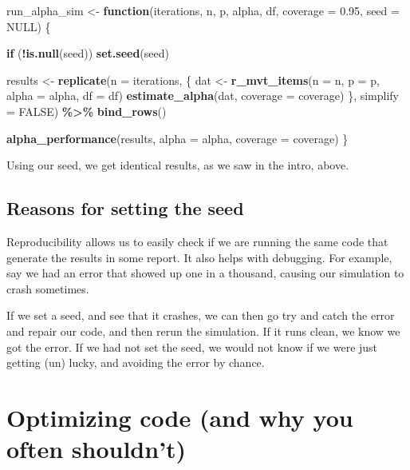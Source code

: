 \documentclass[
]{book}
\newenvironment{Shaded}{\begin{snugshade}}{\end{snugshade}}
\newcommand{\AttributeTok}[1]{\textcolor[rgb]{0.13,0.29,0.53}{#1}}
\newcommand{\ConstantTok}[1]{\textcolor[rgb]{0.56,0.35,0.01}{#1}}
\newcommand{\ControlFlowTok}[1]{\textcolor[rgb]{0.13,0.29,0.53}{\textbf{#1}}}
\newcommand{\FloatTok}[1]{\textcolor[rgb]{0.00,0.00,0.81}{#1}}
\newcommand{\FunctionTok}[1]{\textcolor[rgb]{0.13,0.29,0.53}{\textbf{#1}}}
\newcommand{\NormalTok}[1]{#1}
\newcommand{\OtherTok}[1]{\textcolor[rgb]{0.56,0.35,0.01}{#1}}
\newcommand{\SpecialCharTok}[1]{\textcolor[rgb]{0.81,0.36,0.00}{\textbf{#1}}}
\begin{document}
\begin{Shaded}
\begin{Highlighting}[]
\NormalTok{run\_alpha\_sim }\OtherTok{\textless{}{-}} \ControlFlowTok{function}\NormalTok{(iterations, n, p, alpha, df, }\AttributeTok{coverage =} \FloatTok{0.95}\NormalTok{, }\AttributeTok{seed =} \ConstantTok{NULL}\NormalTok{) \{}
  
  \ControlFlowTok{if}\NormalTok{ (}\SpecialCharTok{!}\FunctionTok{is.null}\NormalTok{(seed)) }\FunctionTok{set.seed}\NormalTok{(seed)}

\NormalTok{  results }\OtherTok{\textless{}{-}} 
    \FunctionTok{replicate}\NormalTok{(}\AttributeTok{n =}\NormalTok{ iterations, \{}
\NormalTok{      dat }\OtherTok{\textless{}{-}} \FunctionTok{r\_mvt\_items}\NormalTok{(}\AttributeTok{n =}\NormalTok{ n, }\AttributeTok{p =}\NormalTok{ p, }\AttributeTok{alpha =}\NormalTok{ alpha, }\AttributeTok{df =}\NormalTok{ df)}
      \FunctionTok{estimate\_alpha}\NormalTok{(dat, }\AttributeTok{coverage =}\NormalTok{ coverage)}
\NormalTok{    \}, }\AttributeTok{simplify =} \ConstantTok{FALSE}\NormalTok{) }\SpecialCharTok{\%\textgreater{}\%}
    \FunctionTok{bind\_rows}\NormalTok{()}
  
  \FunctionTok{alpha\_performance}\NormalTok{(results, }\AttributeTok{alpha =}\NormalTok{ alpha, }\AttributeTok{coverage =}\NormalTok{ coverage)}
\NormalTok{\}}
\end{Highlighting}
\end{Shaded}

Using our seed, we get identical results, as we saw in the intro, above.

\section{Reasons for setting the seed}\label{reasons-for-setting-the-seed}

Reproducibility allows us to easily check if we are running the same code that generate the results in some report.
It also helps with debugging.
For example, say we had an error that showed up one in a thousand, causing our simulation to crash sometimes.

If we set a seed, and see that it crashes, we can then go try and catch the error and repair our code, and then rerun the simulation.
If it runs clean, we know we got the error.
If we had not set the seed, we would not know if we were just getting (un) lucky, and avoiding the error by chance.

\chapter{Optimizing code (and why you often shouldn't)}\label{optimize-code}
\end{document}
